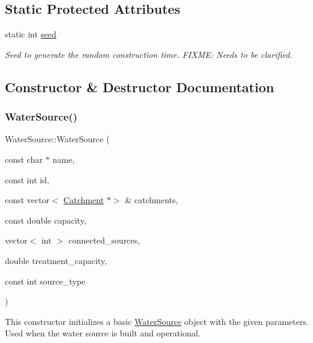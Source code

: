\subsection*{Static Protected Attributes}
\begin{DoxyCompactItemize}
\item 
static int \mbox{\hyperlink{classWaterSource_abaf6cb0ecca08c87428ad516f11f8c2e}{seed}}
\begin{DoxyCompactList}\small\item\em Seed to generate the random construction time. F\+I\+X\+ME\+: Needs to be clarified. \end{DoxyCompactList}\end{DoxyCompactItemize}


\subsection{Constructor \& Destructor Documentation}
\mbox{\label{classWaterSource_a27b9d29d6cbb36d128f740f7ca00f500}} 
\subsubsection{\texorpdfstring{Water\+Source()}{WaterSource()}\hspace{0.1cm}{\footnotesize\ttfamily [1/8]}}
{\footnotesize\ttfamily Water\+Source\+::\+Water\+Source (\begin{DoxyParamCaption}\item[{const char $\ast$}]{name,  }\item[{const int}]{id,  }\item[{const vector$<$ \mbox{\hyperlink{classCatchment}{Catchment}} $\ast$$>$ \&}]{catchments,  }\item[{const double}]{capacity,  }\item[{vector$<$ int $>$}]{connected\+\_\+sources,  }\item[{double}]{treatment\+\_\+capacity,  }\item[{const int}]{source\+\_\+type }\end{DoxyParamCaption})}



This constructor initializes a basic {\ttfamily \mbox{\hyperlink{classWaterSource}{Water\+Source}}} object with the given parameters. Used when the water source is built and operational. 


